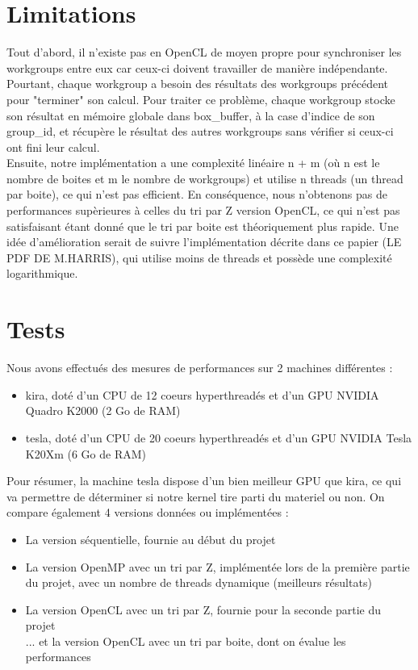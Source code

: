 \documentclass[]{article}
\begin{document}
\section{Limitations}

Tout d'abord, il n'existe pas en OpenCL de moyen propre pour synchroniser les workgroups entre eux car ceux-ci doivent travailler de manière indépendante. Pourtant, chaque workgroup a besoin des résultats des workgroups précédent pour "terminer" son calcul. Pour traiter ce problème, chaque workgroup stocke son résultat en mémoire globale dans box\_buffer, à la case d'indice de son group\_id, et récupère le résultat des autres workgroups sans vérifier si ceux-ci ont fini leur calcul. \\

Ensuite, notre implémentation a une complexité linéaire n + m (où n est le nombre de boites et m le nombre de workgroups) et utilise n threads (un thread par boite), ce qui n'est pas efficient. En conséquence, nous n'obtenons pas de performances supèrieures à celles du tri par Z version OpenCL, ce qui n'est pas satisfaisant étant donné que le tri par boite est théoriquement plus rapide. Une idée d'amélioration serait de suivre l'implémentation décrite dans ce papier (LE PDF DE M.HARRIS), qui utilise moins de threads et possède une complexité logarithmique.\\



\section{Tests}

Nous avons effectués des mesures de performances sur 2 machines différentes : 
\begin{itemize}
\item kira, doté d'un CPU de 12 coeurs hyperthreadés et d'un GPU NVIDIA Quadro K2000 (2 Go de RAM)
\item tesla, doté d'un CPU de 20 coeurs hyperthreadés et d'un GPU NVIDIA Tesla K20Xm (6 Go de RAM) \\
\end{itemize}
Pour résumer, la machine tesla dispose d'un bien meilleur GPU que kira, ce qui va permettre de déterminer si notre kernel tire parti du materiel ou non. 
On compare également 4 versions données ou implémentées :
\begin{itemize}
\item La version séquentielle, fournie au début du projet
\item La version OpenMP avec un tri par Z, implémentée lors de la première partie du projet, avec un nombre de threads dynamique (meilleurs résultats)
\item La version OpenCL avec un tri par Z, fournie pour la seconde partie du projet \\
... et la version OpenCL avec un tri par boite, dont on évalue les performances \\
\end{itemize}
\end{document}

